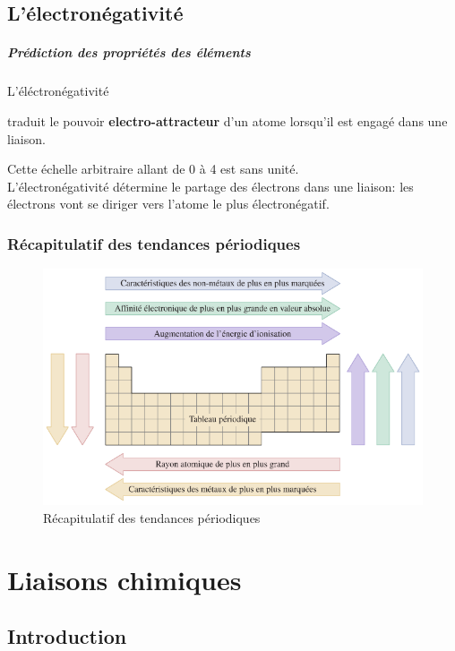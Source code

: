 \documentclass[10pt,a4paper]{book}
\begin{document}
\section{L'électronégativité}

\paragraph{Prédiction des propriétés des éléments} \hypertarget{electronegativity}{L'éléctronégativité} traduit le pouvoir \textbf{electro-attracteur} d'un atome lorsqu'il est engagé dans une liaison. \par 
Cette échelle arbitraire allant de 0 à 4 est sans unité. \\
L'électronégativité détermine le partage des électrons dans une liaison: les électrons vont se diriger vers l'atome le plus électronégatif.

\subsection{Récapitulatif des tendances périodiques}

\begin{figure}[h!]
\begin{center}
\includegraphics[scale=0.75]{./assets/recap_tendencies.png}
\end{center}
\caption{Récapitulatif des tendances périodiques}
\label{fig:recap}
\end{figure}

\chapter{Liaisons chimiques}

\section{Introduction}
\end{document}
